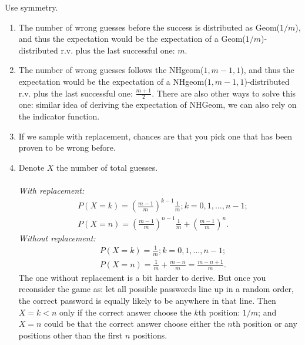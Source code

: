 
\setcounter{theorem}{78}
\begin{exercise} [BH.4.79]
\begin{hint}
    Use symmetry.
\end{hint}
\begin{solution}\begin{enumerate}
    \item The number of wrong guesses before the success is distributed as Geom($1/m$), and thus the expectation would be the expectation of a Geom($1/m$)-distributed r.v. plus the last successful one: $m$.
    \item The number of wrong guesses follows the NHgeom($1,m-1,1$), and thus the expectation would be the expectation of a NHgeom($1,m-1,1$)-distributed r.v. plus the last successful one: $\frac{m+1}{2}$. There are also other ways to solve this one: similar idea of deriving the expectation of NHGeom, we can also rely on the indicator function. 
    \item If we sample with replacement, chances are that you pick one that has been proven to be wrong before.
    \item Denote $X$ the number of total guesses.\\~\\ 
    \textit{With replacement:}
    \begin{align*}
        & P(X=k)=\left(\frac{m-1}{m}\right)^{k-1} \frac{1}{m}; k=0,1,\dots,n-1;\\
        & P(X=n)=\left(\frac{m-1}{m}\right)^{n-1} \frac{1}{m}+\left(\frac{m-1}{m}\right)^{n}.
    \end{align*}
    \textit{Without replacement:}
    \begin{align*}
    & P(X=k)= \frac{1}{m}; k=0,1,\dots,n-1;\\
    & P(X=n)= \frac{1}{m}+\frac{m-n}{m}=\frac{m-n+1}{m}.
    \end{align*}
    The one without replacement is a bit harder to derive. But once you reconsider the game as: let all possible passwords line up in a random order, the correct password is equally likely to be anywhere in that line. Then $X=k<n$ only if the correct answer choose the $k$th position: $1/m$; and $X=n$ could be that the correct answer choose either the $n$th position or any positions other than the first $n$ positions.
\end{enumerate}
\end{solution}
\end{exercise}

